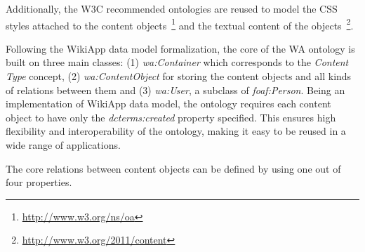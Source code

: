 \documentclass[ngerman,UKenglish,table]{scrbook}
\begin{document}
Additionally, the W3C recommended ontologies are reused to model the CSS styles attached to the content objects~\footnote{\url{http://www.w3.org/ns/oa}} and the textual content of the objects~\footnote{\url{http://www.w3.org/2011/content}}.

Following the WikiApp data model formalization, the core of the WA ontology is built on three main classes: (1) \emph{wa:Container} which corresponds to the \emph{Content Type} concept, (2) \emph{wa:ContentObject} for storing the content objects and all kinds of relations between them and (3) \emph{wa:User}, a subclass of \emph{foaf:Person}.
Being an implementation of WikiApp data model, the ontology requires each content object to have only the \emph{dcterms:created} property specified. 
This ensures high flexibility and interoperability of the ontology, making it easy to be reused in a wide range of applications.

The core relations between content objects can be defined by using one out of four properties.
\end{document}
